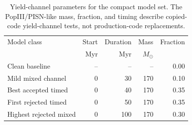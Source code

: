 \begin{table}
\centering
\caption{Yield-channel parameters for the compact model set. The PopIII/PISN-like mass, fraction, and timing describe copied-code yield-channel tests, not production-code replacements.}
\label{tab:yield_parameters}
\begin{tabular}{lrrrr}
\toprule
Model class & Start & Duration & Mass & Fraction \\
 & Myr & Myr & $M_\odot$ & \\
\midrule
Clean baseline & -- & -- & -- & 0.00 \\
Mild mixed channel & 0 & 30 & 170 & 0.10 \\
Best accepted timed & 0 & 40 & 170 & 0.35 \\
First rejected timed & 0 & 50 & 170 & 0.35 \\
Highest rejected mixed & 0 & 100 & 170 & 0.30 \\
\bottomrule
\end{tabular}
\end{table}
